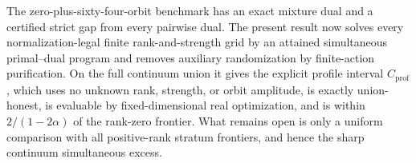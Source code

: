 The zero-plus-sixty-four-orbit benchmark has an exact mixture dual and a certified strict gap from every pairwise dual.  The present result now solves every normalization-legal finite rank-and-strength grid by an attained simultaneous primal--dual program and removes auxiliary randomization by finite-action purification.  On the full continuum union it gives the explicit profile interval \(C_{\mathrm{prof}}\), which uses no unknown rank, strength, or orbit amplitude, is exactly union-honest, is evaluable by fixed-dimensional real optimization, and is within \(2/(1-2\alpha)\) of the rank-zero frontier.  What remains open is only a uniform comparison with all positive-rank stratum frontiers, and hence the sharp continuum simultaneous excess.